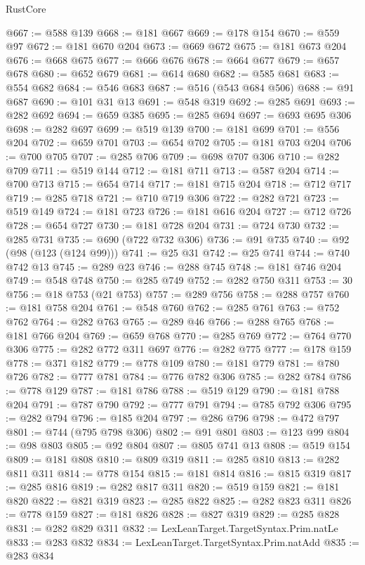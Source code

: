 \begin{lexlean}{RustCore}
\begin{coremodule}
@667 := @588 @139
@668 := @181 @667
@669 := @178 @154
@670 := @559 @97
@672 := @181 @670 @204
@673 := @669 @672
@675 := @181 @673 @204
@676 := @668 @675
@677 := @666 @676
@678 := @664 @677
@679 := @657 @678
@680 := @652 @679
@681 := @614 @680
@682 := @585 @681
@683 := @554 @682
@684 := @546 @683
@687 := @516 (@543 @684 @506)
@688 := @91 @687
@690 := @101 @31 @13
@691 := @548 @319
@692 := @285 @691
@693 := @282 @692
@694 := @659 @385
@695 := @285 @694
@697 := @693 @695 @306
@698 := @282 @697
@699 := @519 @139
@700 := @181 @699
@701 := @556 @204
@702 := @659 @701
@703 := @654 @702
@705 := @181 @703 @204
@706 := @700 @705
@707 := @285 @706
@709 := @698 @707 @306
@710 := @282 @709
@711 := @519 @144
@712 := @181 @711
@713 := @587 @204
@714 := @700 @713
@715 := @654 @714
@717 := @181 @715 @204
@718 := @712 @717
@719 := @285 @718
@721 := @710 @719 @306
@722 := @282 @721
@723 := @519 @149
@724 := @181 @723
@726 := @181 @616 @204
@727 := @712 @726
@728 := @654 @727
@730 := @181 @728 @204
@731 := @724 @730
@732 := @285 @731
@735 := @690 (@722 @732 @306)
@736 := @91 @735
@740 := @92 (@98 (@123 (@124 @99)))
@741 := @25 @31
@742 := @25 @741
@744 := @740 @742 @13
@745 := @289 @23
@746 := @288 @745
@748 := @181 @746 @204
@749 := @548 @748
@750 := @285 @749
@752 := @282 @750 @311
@753 := 30
@756 := @18 @753 (@21 @753)
@757 := @289 @756
@758 := @288 @757
@760 := @181 @758 @204
@761 := @548 @760
@762 := @285 @761
@763 := @752 @762
@764 := @282 @763
@765 := @289 @46
@766 := @288 @765
@768 := @181 @766 @204
@769 := @659 @768
@770 := @285 @769
@772 := @764 @770 @306
@775 := @282 @772 @311 @697
@776 := @282 @775
@777 := @178 @159
@778 := @371 @182
@779 := @778 @109
@780 := @181 @779
@781 := @780 @726
@782 := @777 @781
@784 := @776 @782 @306
@785 := @282 @784
@786 := @778 @129
@787 := @181 @786
@788 := @519 @129
@790 := @181 @788 @204
@791 := @787 @790
@792 := @777 @791
@794 := @785 @792 @306
@795 := @282 @794
@796 := @185 @204
@797 := @286 @796
@798 := @472 @797
@801 := @744 (@795 @798 @306)
@802 := @91 @801
@803 := @123 @99
@804 := @98 @803
@805 := @92 @804
@807 := @805 @741 @13
@808 := @519 @154
@809 := @181 @808
@810 := @809 @319
@811 := @285 @810
@813 := @282 @811 @311
@814 := @778 @154
@815 := @181 @814
@816 := @815 @319
@817 := @285 @816
@819 := @282 @817 @311
@820 := @519 @159
@821 := @181 @820
@822 := @821 @319
@823 := @285 @822
@825 := @282 @823 @311
@826 := @778 @159
@827 := @181 @826
@828 := @827 @319
@829 := @285 @828
@831 := @282 @829 @311
@832 := LexLeanTarget.TargetSyntax.Prim.natLe
@833 := @283 @832
@834 := LexLeanTarget.TargetSyntax.Prim.natAdd
@835 := @283 @834

\end{coremodule}
\end{lexlean}
